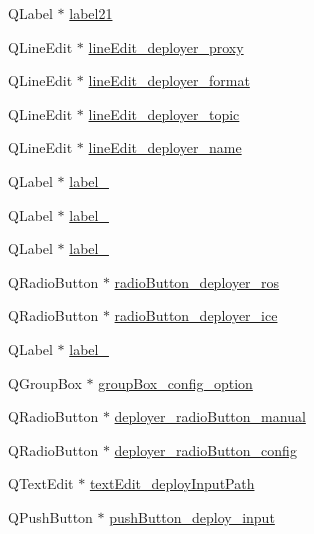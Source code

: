 \begin{DoxyCompactItemize}
Q\+Label $\ast$ \hyperlink{class_ui___main_window_a2329b4baa731ff6106c45b0bb6ec4893}{label21}
\item 
Q\+Line\+Edit $\ast$ \hyperlink{class_ui___main_window_ac395bc4a1dd028cd5f85bce65c0463ea}{line\+Edit\+\_\+deployer\+\_\+proxy}
\item 
Q\+Line\+Edit $\ast$ \hyperlink{class_ui___main_window_ac23a736dfa7fff9249866182dcce5790}{line\+Edit\+\_\+deployer\+\_\+format}
\item 
Q\+Line\+Edit $\ast$ \hyperlink{class_ui___main_window_ad2ce4be4b75ab5482b415395da10436b}{line\+Edit\+\_\+deployer\+\_\+topic}
\item 
Q\+Line\+Edit $\ast$ \hyperlink{class_ui___main_window_a541f170f749071309a460ba495cd89a0}{line\+Edit\+\_\+deployer\+\_\+name}
\item 
Q\+Label $\ast$ \hyperlink{class_ui___main_window_a2e2516d755e4dd53fc905dabddf2738a}{label\+\_}
\item 
Q\+Label $\ast$ \hyperlink{class_ui___main_window_a0376fd90247280e7c7957cc70628708c}{label\+\_}
\item 
Q\+Label $\ast$ \hyperlink{class_ui___main_window_a78c7e10730b43c6700cd7216911ed76a}{label\+\_}
\item 
Q\+Radio\+Button $\ast$ \hyperlink{class_ui___main_window_a6ee3e9ca7cda2419ac4875c2b277278f}{radio\+Button\+\_\+deployer\+\_\+ros}
\item 
Q\+Radio\+Button $\ast$ \hyperlink{class_ui___main_window_a52b4083d2b396df2f586647265734b81}{radio\+Button\+\_\+deployer\+\_\+ice}
\item 
Q\+Label $\ast$ \hyperlink{class_ui___main_window_ac373fcccf2e96fd99c9ad588deaaded3}{label\+\_}
\item 
Q\+Group\+Box $\ast$ \hyperlink{class_ui___main_window_a902a6d570c293bd6c90142d653535dee}{group\+Box\+\_\+config\+\_\+option}
\item 
Q\+Radio\+Button $\ast$ \hyperlink{class_ui___main_window_ad46a13f4208e092bfc0c0ca195d889d3}{deployer\+\_\+radio\+Button\+\_\+manual}
\item 
Q\+Radio\+Button $\ast$ \hyperlink{class_ui___main_window_a17cda14f9734fbb7b7cbf7a5ab2b7ded}{deployer\+\_\+radio\+Button\+\_\+config}
\item 
Q\+Text\+Edit $\ast$ \hyperlink{class_ui___main_window_a20ff828181fe529d5dcdb0faf41235f3}{text\+Edit\+\_\+deploy\+Input\+Path}
\item 
Q\+Push\+Button $\ast$ \hyperlink{class_ui___main_window_a76e5b3c7f2cc01e3150928540d5e4b3c}{push\+Button\+\_\+deploy\+\_\+input}

\end{DoxyCompactItemize}
